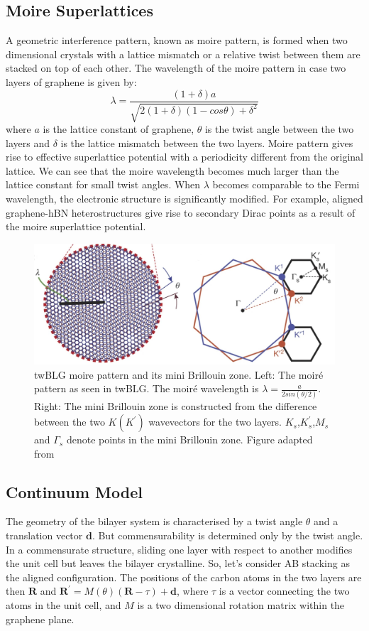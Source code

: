 \subsection{Moire Superlattices}
A geometric interference pattern, known as moire pattern, is formed when two dimensional crystals with a lattice mismatch or a relative twist between them are stacked on top of each other. The wavelength of the moire pattern in case two layers of graphene is given by:
\begin{equation}
    \lambda = \frac{(1+\delta)a}{\sqrt{2(1+\delta)(1-cos\theta)+\delta^2}}
\end{equation}
where $a$ is the lattice constant of graphene, $\theta$ is the twist angle between the two layers and $\delta$ is the lattice mismatch between the two layers. Moire pattern gives rise to effective superlattice potential with a periodicity different from the original lattice. We can see that the moire wavelength becomes much larger than the lattice constant for small twist angles. When $\lambda$ becomes comparable to the Fermi wavelength, the electronic structure is significantly modified. For example, aligned graphene-hBN heterostructures give rise to secondary Dirac points as a result of the moire superlattice potential.
 \begin{figure}[H]
        \centering
         \includegraphics[width=\textwidth]{figures/twblg_lattice.jpg}
         \caption{twBLG moire pattern and its mini Brillouin zone. Left:  The moiré pattern as seen in twBLG. The moiré wavelength is $\lambda=\frac{a}{2sin(\theta/2)}$. Right: The mini Brillouin zone is constructed from the difference between the two $K(K^\prime)$ wavevectors for the two layers. $K_s$,$K_s^\prime$,$M_s$ and $\Gamma_s$ denote points in the mini Brillouin zone. Figure adapted from \cite{Cao2018}}
         \label{fig:twblg_lattice}
\end{figure}

\subsection{Continuum Model}
The geometry of the bilayer system is characterised by a twist angle $\theta$ and a translation vector $\mathbf{d}$. But commensurability is determined only by the twist angle. In a commensurate structure, sliding one layer with respect to another modifies the unit cell but leaves the bilayer crystalline. So, let's consider AB stacking as the aligned configuration. The positions of the carbon atoms in the two layers are then $\mathbf{R}$ and $\mathbf{R^{\prime}} = M(\theta)(\mathbf{R}-\tau)+\mathbf{d}$, where $\tau$ is a vector connecting the two atoms in the unit cell, and $M$ is a two dimensional rotation matrix within the graphene plane.

